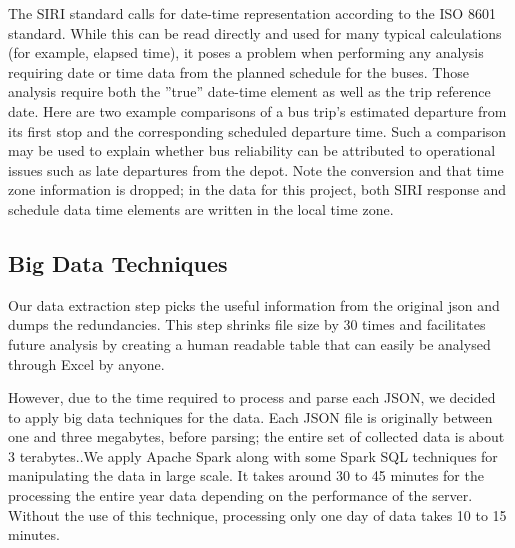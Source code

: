 \documentclass[12pt]{report}
\begin{document}
The SIRI standard calls for date-time representation according to the ISO 8601 standard.  While this can be read directly and used for many typical calculations (for example, elapsed time), it poses a problem when performing any analysis requiring date or time data from the planned schedule for the buses.  Those analysis require both the ''true'' date-time element as well as the trip reference date.  Here are two example comparisons of a bus trip's estimated departure from its first stop and the corresponding scheduled departure time. Such a comparison may be used to explain whether bus reliability can be attributed to operational issues such as late departures from the depot.  Note the conversion and that time zone information is dropped; in the data for this project, both SIRI response and schedule data time elements are written in the local time zone.

\vspace{0.5cm}


\vspace{0.5cm}


\subsection{Big Data Techniques}

Our data extraction step picks the useful information from the original json and dumps the redundancies. This step shrinks file size by 30 times and facilitates future analysis by creating a  human readable table that can easily be analysed through Excel by anyone.



However, due to the time required to process and parse each JSON, we decided to apply big data techniques for the data. Each JSON file is originally between one and three megabytes, before parsing; the entire set of collected data is about 3 terabytes..We apply Apache Spark along with some Spark SQL techniques for manipulating the data in large scale. It takes around 30 to 45 minutes for the processing the entire year data depending on the performance of the server.  Without the use of this technique, processing only one day of data takes 10 to 15 minutes.
\end{document}
